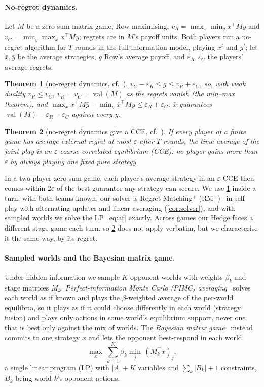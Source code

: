 \documentclass[10pt]{article}
\theoremstyle{tplain}
\newtheorem{theorem}{Theorem}
\theoremstyle{tdef}
\theoremstyle{trem}
\DeclareMathOperator{\val}{val}
\begin{document}
\paragraph{No-regret dynamics.} Let $M$ be a zero-sum matrix game, Row maximising, $v_R=\max_x\min_yx^\top My$ and $v_C=\min_y\max_xx^\top My$; regrets are in $M$'s payoff units. Both players run a no-regret algorithm for $T$ rounds in the full-information model, playing $x^t$ and $y^t$; let $\bar x,\bar y$ be the average strategies, $\bar g$ Row's average payoff, and $\varepsilon_R,\varepsilon_C$ the players' average regrets.
\begin{theorem}[no-regret dynamics, cf.~\cite{FS99}]\label{fact:selfplay}
$v_C-\varepsilon_R\le\bar g\le v_R+\varepsilon_C$, so, with weak duality $v_R\le v_C$, $v_R=v_C=\val(M)$ as the regrets vanish (the min--max theorem), and $\max_xx^\top M\bar y-\min_y\bar x^\top My\le\varepsilon_R+\varepsilon_C$: $\bar x$ guarantees $\val(M)-\varepsilon_R-\varepsilon_C$ against every $y$.
\end{theorem}
\begin{theorem}[no-regret dynamics give a CCE, cf.\ {\cite[\S7.4, as the Hannan set]{CBL06}}]\label{thm:cce}
If every player of a finite game has average external regret at most $\varepsilon$ after $T$ rounds, the time-average of the joint play is an $\varepsilon$-coarse correlated equilibrium (CCE): no player gains more than $\varepsilon$ by always playing one fixed pure strategy.
\end{theorem}
In a two-player zero-sum game, each player's average strategy in an $\varepsilon$-CCE then comes within $2\varepsilon$ of the best guarantee any strategy can secure. We use \cref{fact:selfplay} inside a turn: with both teams known, our solver is Regret Matching$^+$ (RM$^+$)~\cite{Tam14} in self-play with alternating updates and linear averaging (\cref{cor:solver}), and with sampled worlds we solve the LP~\eqref{eq:af} exactly. Across games our Hedge faces a different stage game each turn, so \cref{thm:cce} does not apply verbatim, but we characterise it the same way, by its regret.

\paragraph{Sampled worlds and the Bayesian matrix game.} Under hidden information we sample $K$ opponent worlds with weights $\beta_k$ and stage matrices $M_k$. \emph{Perfect-information Monte Carlo (PIMC) averaging}~\cite{Lon10} solves each world as if known and plays the $\beta$-weighted average of the per-world equilibria, so it plays as if it could choose differently in each world (strategy fusion) and plays only actions in some world's equilibrium support, never one that is best only against the mix of worlds. The \emph{Bayesian matrix game}~\cite{Yu26} instead commits to one strategy $x$ and lets the opponent best-respond in each world:
\begin{equation}\label{eq:af}
\max_x\ \textstyle\sum_{k=1}^K \beta_k\min_j\,(M_k^\top x)_j ,
\end{equation}
a single linear program (LP) with $|A|+K$ variables and $\sum_k|B_k|+1$ constraints, $B_k$ being world $k$'s opponent actions.
\end{document}
